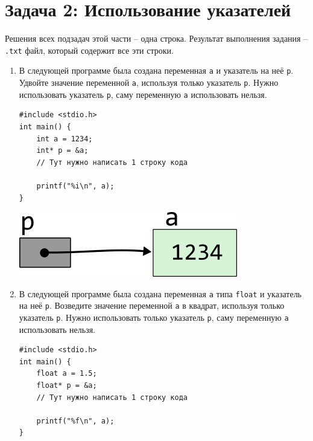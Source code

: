 \documentclass{article}
\begin{document}
\section*{Задача 2: Использование указателей}
Решения всех подзадач этой части -- одна строка. Результат выполнения задания -- \texttt{.txt} файл, который содержит все эти строки.
\begin{enumerate}
\item В следующей программе была создана переменная \texttt{a} и указатель на неё \texttt{p}. Удвойте значение переменной \texttt{a}, используя только указатель \texttt{p}. Нужно использовать указатель \texttt{p}, саму переменную \texttt{a} использовать нельзя.
\begin{multicols}{2}
\begin{lstlisting}
#include <stdio.h>
int main() {
    int a = 1234;
    int* p = &a;
    // Тут нужно написать 1 строку кода
    
    printf("%i\n", a);
}
\end{lstlisting}

\vfill \null    
\columnbreak
\vfill \null 

\begin{center}
\vspace{1cm} 
\includegraphics[scale=1]{../images/pointer_schemes/pointer_to_int.png}
\end{center}
\end{multicols}

\item В следующей программе была создана переменная \texttt{a} типа \texttt{float} и указатель на неё \texttt{p}. Возведите значение переменной \texttt{a} в квадрат, используя только указатель \texttt{p}. Нужно использовать только указатель \texttt{p}, саму переменную \texttt{a} использовать нельзя.
\begin{multicols}{2}
\begin{lstlisting}
#include <stdio.h>
int main() {
    float a = 1.5;
    float* p = &a;
    // Тут нужно написать 1 строку кода
    
    printf("%f\n", a);
}
\end{lstlisting}

\vfill \null    
\columnbreak
\vfill \null 


\end{multicols}
\end{enumerate}
\end{document}
